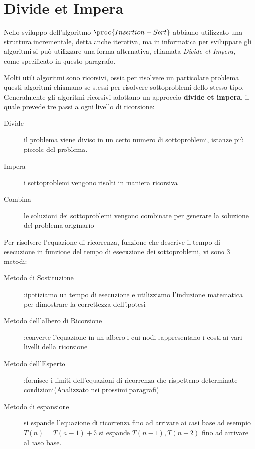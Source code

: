 \chapter{Divide et Impera}
Nello sviluppo dell'algoritmo $\proc{Insertion-Sort}$ abbiamo utilizzato una
struttura incrementale, detta anche iterativa, ma in informatica per sviluppare
gli algoritmi si può utilizzare una forma alternativa, chiamata \emph{Divide et Impera},
come specificato in questo paragrafo.

Molti utili algoritmi sono ricorsivi, ossia per risolvere un particolare problema
questi algoritmi chiamano se stessi per risolvere sottoproblemi dello stesso tipo.
Generalmente gli algoritmi ricorsivi adottano un approccio \textbf{divide et impera},
il quale prevede tre passi a ogni livello di ricorsione:
\begin{description}
    \item[Divide]il problema viene diviso in un certo numero di sottoproblemi, istanze
                  più piccole del problema.
    \item[Impera]i sottoproblemi vengono risolti in maniera ricorsiva
    \item[Combina]le soluzioni dei sottoproblemi vengono combinate per generare
                   la soluzione del problema originario
\end{description}


Per risolvere l'equazione di ricorrenza, funzione che descrive il tempo di esecuzione
in funzione del tempo di esecuzione dei sottoproblemi, vi sono 3 metodi:
\begin{description}
    \item[Metodo di Sostituzione]:ipotiziamo un tempo di esecuzione e utilizziamo
                l'induzione matematica per dimostrare la correttezza dell'ipotesi
    \item[Metodo dell'albero di Ricorsione]:converte l'equazione in un albero i cui
          nodi rappresentano i costi ai vari livelli della ricorsione
    \item[Metodo dell'Esperto]:fornisce i limiti dell'equazioni di ricorrenza che
          rispettano determinate condizioni(Analizzato nei prossimi paragrafi)
    \item[Metodo di espansione] si espande l'equazione di ricorrenza fino ad arrivare ai casi base
          ad esempio $T(n) = T(n-1) + 3$ si espande $T(n-1),T(n-2)$ fino ad arrivare al caso base.
\end{description}



